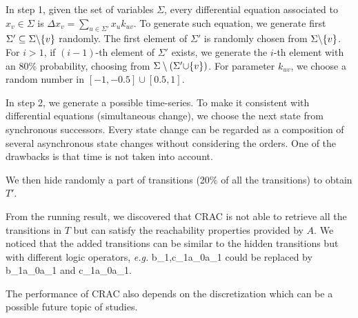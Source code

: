 In step 1, given the set of variables $\Sigma$, every differential equation associated to $x_v\in \Sigma$ is $\Delta x_v=\sum_{u\in \Sigma'}x_u k_{uv}$. 
To generate such equation, we generate first $\Sigma'\subseteq \Sigma\miset{v}$ randomly.
The first element of $\Sigma'$ is randomly chosen from $\Sigma\miset{v}$.
For $i>1$, if $(i-1)$-th element of $\Sigma'$ exists, we generate the $i$-th element with an 80\% probability, choosing from $\Sigma\setminus(\Sigma'\addset{v})$.
For parameter $k_{uv}$, we choose a random number in $[-1,-0.5]\cup[0.5,1]$.

In step 2, we generate a possible time-series.
To make it consistent with differential equations (simultaneous change), we choose the next state from synchronous successors.
Every state change can be regarded as a composition of several asynchronous state changes without considering the orders.
One of the drawbacks is that time is not taken into account.

We then hide randomly a part of transitions (20\% of all the transitions) to obtain $T'$. %

From the running result, we discovered that CRAC is not able to retrieve all the transitions in $T$ but can satisfy the reachability properties provided by $A$.
We noticed that the added transitions can be similar to the hidden transitions but with different logic operators, \textit{e.g.} \ac{b_1,c_1}{a_0}{a_1} could be replaced by \ac{b_1}{a_0}{a_1} and \ac{c_1}{a_0}{a_1}.

The performance of CRAC also depends on the discretization  which can be a possible future topic of studies.


